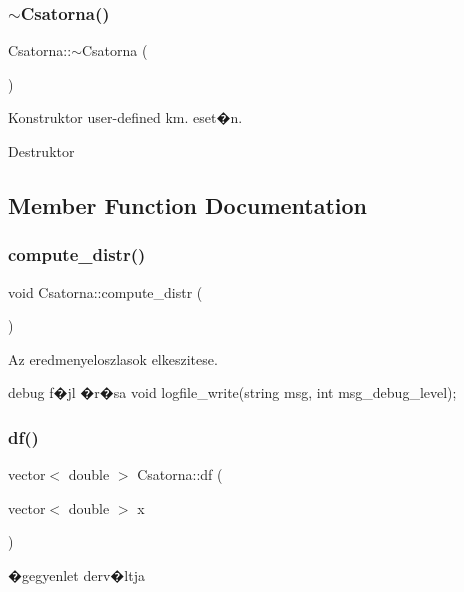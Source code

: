\subsubsection{\texorpdfstring{$\sim$\+Csatorna()}{~Csatorna()}}
{\footnotesize\ttfamily Csatorna\+::$\sim$\+Csatorna (\begin{DoxyParamCaption}{ }\end{DoxyParamCaption})}



Konstruktor user-\/defined km. eset�n. 

Destruktor 

\subsection{Member Function Documentation}
\mbox{\label{class_csatorna_a2ad82029529f1aa2b4da3122b608eb6c}} 
\subsubsection{\texorpdfstring{compute\+\_\+distr()}{compute\_distr()}}
{\footnotesize\ttfamily void Csatorna\+::compute\+\_\+distr (\begin{DoxyParamCaption}{ }\end{DoxyParamCaption})}



Az eredmenyeloszlasok elkeszitese. 

debug f�jl �r�sa void logfile\+\_\+write(string msg, int msg\+\_\+debug\+\_\+level); \mbox{\label{class_csatorna_a5330dbbbc669f49382c822ffcc671d16}} 
\subsubsection{\texorpdfstring{df()}{df()}}
{\footnotesize\ttfamily vector$<$ double $>$ Csatorna\+::df (\begin{DoxyParamCaption}\item[{vector$<$ double $>$}]{x }\end{DoxyParamCaption})\hspace{0.3cm}{\ttfamily [virtual]}}



�gegyenlet derv�ltja 

